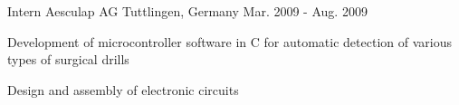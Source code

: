 \begin{cventries}
  \cventry
  {Intern} %
  {Aesculap AG} %
  {Tuttlingen, Germany} %
  {Mar. 2009 - Aug. 2009} %
  {
    \begin{cvitems}
      \item {Development of microcontroller software in C for automatic detection of various types of surgical drills}
      \item {Design and assembly of electronic circuits}
    \end{cvitems}
  }

\end{cventries}
